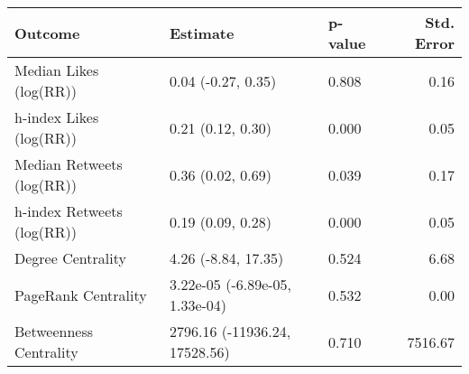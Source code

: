 \begin{table}[ht]
\centering
\begin{tabular}{lllr}
  \hline
Outcome & Estimate & p-value & Std. Error \\ 
  \hline
Median Likes (log(RR)) & 0.04 (-0.27, 0.35) & 0.808 & 0.16 \\ 
  h-index Likes (log(RR)) & 0.21 (0.12, 0.30) & 0.000 & 0.05 \\ 
  Median Retweets (log(RR)) & 0.36 (0.02, 0.69) & 0.039 & 0.17 \\ 
  h-index Retweets (log(RR)) & 0.19 (0.09, 0.28) & 0.000 & 0.05 \\ 
  Degree Centrality & 4.26 (-8.84, 17.35) & 0.524 & 6.68 \\ 
  PageRank Centrality & 3.22e-05 (-6.89e-05, 1.33e-04) & 0.532 & 0.00 \\ 
  Betweenness Centrality & 2796.16 (-11936.24, 17528.56) & 0.710 & 7516.67 \\ 
   \hline
\end{tabular}
\end{table}
